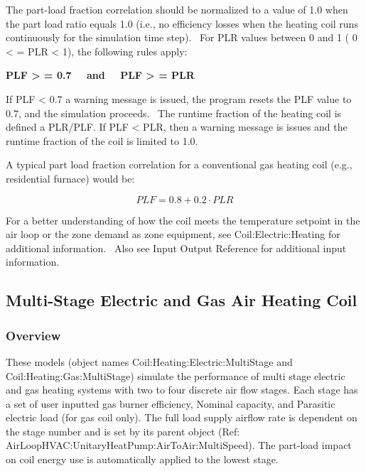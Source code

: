 The part-load fraction correlation should be normalized to a value of 1.0 when the part load ratio equals 1.0 (i.e., no efficiency losses when the heating coil runs continuously for the simulation time step).~ For PLR values between 0 and 1 ( 0 \textless{} = PLR \textless{} 1), the following rules apply:

\textbf{PLF \textgreater{} = 0.7~~ and~~ PLF \textgreater{} = PLR}

If PLF \textless{} 0.7 a warning message is issued, the program resets the PLF value to 0.7, and the simulation proceeds.~ The runtime fraction of the heating coil is defined a PLR/PLF. If PLF \textless{} PLR, then a warning message is issues and the runtime fraction of the coil is limited to 1.0.

A typical part load fraction correlation for a conventional gas heating coil (e.g., residential furnace) would be:

\begin{equation}
PLF = 0.8 + 0.2\cdot PLR
\end{equation}

For a better understanding of how the coil meets the temperature setpoint in the air loop or the zone demand as zone equipment, see Coil:Electric:Heating for additional information.~ Also see Input Output Reference for additional input information.

\subsection{Multi-Stage Electric and Gas Air Heating Coil}\label{multi-stage-electric-and-gas-air-heating-coil}

\subsubsection{Overview}\label{overview-5-001}

These models (object names Coil:Heating:Electric:MultiStage and Coil:Heating:Gas:MultiStage) simulate the performance of multi stage electric and gas heating systems with two to four discrete air flow stages. Each stage has a set of user inputted gas burner efficiency, Nominal capacity, and Parasitic electric load (for gas coil only). The full load supply airflow rate is dependent on the stage number and is set by its parent object (Ref: AirLoopHVAC:UnitaryHeatPump:AirToAir:MultiSpeed). The part-load impact on coil energy use is automatically applied to the lowest stage.

